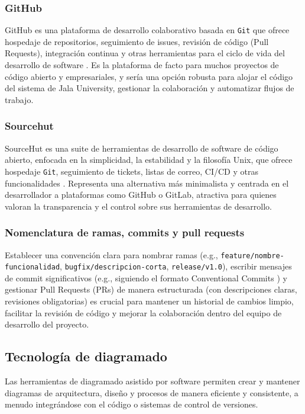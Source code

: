 \subsubsection{GitHub}
GitHub es una plataforma de desarrollo colaborativo basada en \texttt{Git} que ofrece hospedaje de repositorios, seguimiento de issues, revisión de código (Pull Requests), integración continua y otras herramientas para el ciclo de vida del desarrollo de software \parencite{GitHub}. Es la plataforma de facto para muchos proyectos de código abierto y empresariales, y sería una opción robusta para alojar el código del sistema de Jala University, gestionar la colaboración y automatizar flujos de trabajo.

\subsubsection{Sourcehut}
SourceHut es una suite de herramientas de desarrollo de software de código abierto, enfocada en la simplicidad, la estabilidad y la filosofía Unix, que ofrece hospedaje \texttt{Git}, seguimiento de tickets, listas de correo, CI/CD y otras funcionalidades \parencite{SourceHut}. Representa una alternativa más minimalista y centrada en el desarrollador a plataformas como GitHub o GitLab, atractiva para quienes valoran la transparencia y el control sobre sus herramientas de desarrollo.

\subsubsection{Nomenclatura de ramas, commits y pull requests}
Establecer una convención clara para nombrar ramas (e.g., \texttt{feature/nombre-funcionalidad}, \texttt{bugfix/descripcion-corta}, \texttt{release/v1.0}), escribir mensajes de commit significativos (e.g., siguiendo el formato Conventional Commits \parencite{ConventionalCommits}) y gestionar Pull Requests (PRs) de manera estructurada (con descripciones claras, revisiones obligatorias) es crucial para mantener un historial de cambios limpio, facilitar la revisión de código y mejorar la colaboración dentro del equipo de desarrollo del proyecto.

\subsection{Tecnología de diagramado}
Las herramientas de diagramado asistido por software permiten crear y mantener diagramas de arquitectura, diseño y procesos de manera eficiente y consistente, a menudo integrándose con el código o sistemas de control de versiones.

